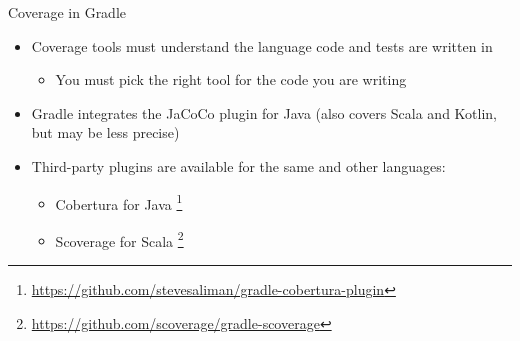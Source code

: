 \documentclass[presentation]{beamer}
\newcommand{\fnurl}[1]{\footnote{\url{#1}}}
\begin{document}
\begin{frame}[fragile]{Coverage in Gradle}
    \begin{itemize}
        \item Coverage tools must understand the language code and tests are written in
        \begin{itemize}
            \item You must pick the right tool for the code you are writing
        \end{itemize}
        \item Gradle integrates the JaCoCo plugin for Java (also covers Scala and Kotlin, but may be less precise)
        \item Third-party plugins are available for the same and other languages:
        \begin{itemize}
            \item Cobertura for Java \fnurl{https://github.com/stevesaliman/gradle-cobertura-plugin}
            \item Scoverage for Scala \fnurl{https://github.com/scoverage/gradle-scoverage}
        \end{itemize}
    \end{itemize}
\end{frame}
\end{document}
